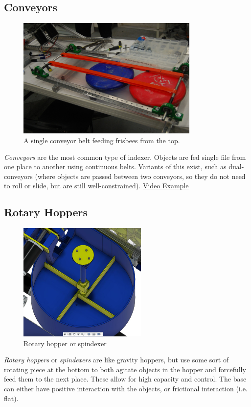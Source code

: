 \subsection{Conveyors}
\begin{figure}[H]
	\includegraphics[width=0.8\textwidth]{imgs/conveyor_single.jpeg}
	\caption{A single conveyor belt feeding frisbees from the top.}
\end{figure}
\textit{Conveyors} are the most common type of indexer. Objects are fed single file from one place to another using continuous belts. Variants of this exist, such as dual-conveyors (where objects are passed between two conveyors, so they do not need to roll or slide, but are still well-constrained).
\href{https://www.youtube.com/watch?v=by2A56mHdRM}{\color{red}\underline{Video Example}}
\subsection{Rotary Hoppers}
\begin{figure}[H]
	\includegraphics[height=2.3in]{imgs/spindexer.jpeg}
	\caption{Rotary hopper or spindexer}
\end{figure}

\textit{Rotary hoppers} or \textit{spindexers} are like gravity hoppers, but use some sort of rotating piece at the bottom to both agitate objects in the hopper and forcefully feed them to the next place. These allow for high capacity and control. The base can either have positive interaction with the objects, or frictional interaction (i.e. flat). 


